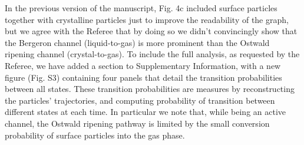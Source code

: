 \documentclass[11pt]{article}
\begin{document}
\bigskip
\doublespacing

In the previous version of the manuscript, Fig. 4c included surface particles together with crystalline particles just to improve
the readability of the graph, but we agree with the Referee that by doing so we didn't convincingly show that the Bergeron channel (liquid-to-gas)
is more prominent than the Ostwald ripening channel (crystal-to-gas). 
To include the full analysis, as requested by the Referee,
we have added a section to Supplementary Information, with a new figure (Fig. S3) containing four panels that detail the transition
probabilities between all states. These transition probabilities are measures by reconstructing the particles' trajectories, and
computing probability of transition between different states at each time.
In particular we note that, while being an active channel, the Ostwald ripening pathway is limited by
the small conversion probability of surface particles into the gas phase.




\vspace{1em}

\singlespacing
\end{document}
